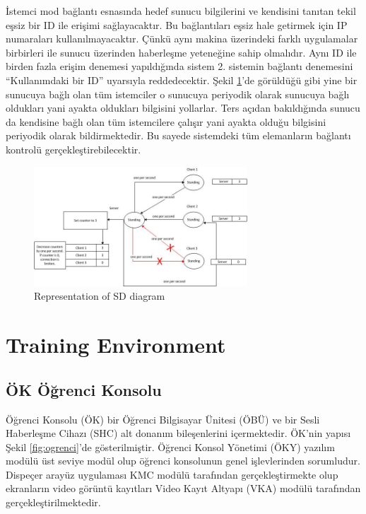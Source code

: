 \documentclass[conference]{IEEEtran}
\begin{document}
İstemci mod bağlantı esnasında hedef sunucu bilgilerini ve kendisini tanıtan tekil eşsiz bir ID ile erişimi sağlayacaktır. Bu bağlantıları eşsiz hale getirmek için IP numaraları kullanılmayacaktır. Çünkü aynı makina üzerindeki farklı uygulamalar birbirleri ile sunucu üzerinden haberleşme yeteneğine sahip olmalıdır. Aynı ID ile birden fazla erişim denemesi yapıldığında sistem 2. sistemin bağlantı denemesini “Kullanımdaki bir ID” uyarsıyla reddedecektir. 
Şekil \ref{fig:SDDiagram}'de görüldüğü gibi yine bir sunucuya bağlı olan tüm istemciler o sunucuya periyodik olarak sunucuya bağlı oldukları yani ayakta oldukları bilgisini yollarlar. Ters açıdan bakıldığında sunucu da kendisine bağlı olan tüm istemcilere çalışır yani ayakta olduğu bilgisini periyodik olarak bildirmektedir. Bu sayede sistemdeki tüm elemanların bağlantı kontrolü gerçekleştirebilecektir. 


\begin{figure}[h!]
  \centering
  \includegraphics[width=8cm]{SDDiagram.jpg}
  \caption{Representation of SD  diagram}\label{fig:SDDiagram}
\end{figure}




\section{Training Environment}

\subsection{ÖK Öğrenci Konsolu}

Öğrenci Konsolu (ÖK) bir Öğrenci Bilgisayar Ünitesi (ÖBÜ) ve bir Sesli Haberleşme Cihazı (SHC) alt donanım bileşenlerini içermektedir. ÖK’nin yapısı Şekil \ref{fig:ogrenci}'de gösterilmiştir.
Öğrenci Konsol Yönetimi (ÖKY) yazılım modülü üst seviye modül olup öğrenci konsolunun genel işlevlerinden sorumludur. Dispeçer arayüz uygulaması  KMC modülü tarafından gerçekleştirmekte olup ekranların video görüntü kayıtları Video Kayıt Altyapı (VKA) modülü tarafından gerçekleştirilmektedir.
\end{document}
